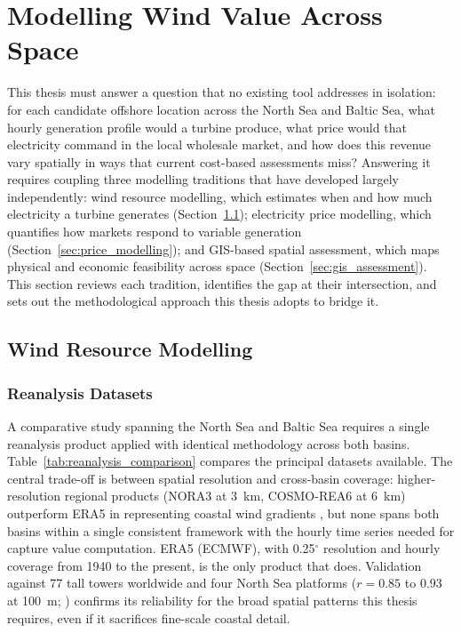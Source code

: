 
\section{Modelling Wind Value Across Space}\label{sec:modelling}

This thesis must answer a question that no existing tool addresses in isolation: for each candidate offshore location across the North Sea and Baltic Sea, what hourly generation profile would a turbine produce, what price would that electricity command in the local wholesale market, and how does this revenue vary spatially in ways that current cost-based assessments miss? Answering it requires coupling three modelling traditions that have developed largely independently: wind resource modelling, which estimates when and how much electricity a turbine generates (Section~\ref{sec:wind_modelling}); electricity price modelling, which quantifies how markets respond to variable generation (Section~\ref{sec:price_modelling}); and GIS-based spatial assessment, which maps physical and economic feasibility across space (Section~\ref{sec:gis_assessment}). This section reviews each tradition, identifies the gap at their intersection, and sets out the methodological approach this thesis adopts to bridge it.

\subsection{Wind Resource Modelling}\label{sec:wind_modelling}

\subsubsection{Reanalysis Datasets}\label{sec:reanalysis}

A comparative study spanning the North Sea and Baltic Sea requires a single reanalysis product applied with identical methodology across both basins. Table~\ref{tab:reanalysis_comparison} compares the principal datasets available. The central trade-off is between spatial resolution and cross-basin coverage: higher-resolution regional products (NORA3 at 3~km, COSMO-REA6 at 6~km) outperform ERA5 in representing coastal wind gradients \cite{Solbrekke2022, Spangehl2021}, but none spans both basins within a single consistent framework with the hourly time series needed for capture value computation. ERA5 (ECMWF), with 0.25$^{\circ}$ resolution and hourly coverage from 1940 to the present, is the only product that does. Validation against 77 tall towers worldwide \cite{Staffell2016, Ramon2019} and four North Sea platforms ($r = 0.85$ to $0.93$ at 100~m; \cite{Bot2024}) confirms its reliability for the broad spatial patterns this thesis requires, even if it sacrifices fine-scale coastal detail.

